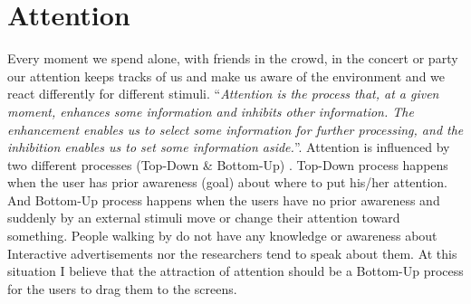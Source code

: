 \section{Attention}



Every moment we spend alone, with friends in the crowd, in the concert or party our attention keeps tracks of us and make us aware of the environment and we react differently for different stimuli. ``\emph{Attention is the process that, at a given moment, enhances some information and inhibits other information. The enhancement enables us to select some information for further processing, and the inhibition enables us to set some information aside.}''\cite{Attention}. Attention is influenced by two different processes (Top-Down \& Bottom-Up) \cite{attention1,Attention}. Top-Down process happens when the user has prior awareness (goal) about where to put his/her attention. And Bottom-Up process happens when the users have no prior awareness and suddenly by an external stimuli move or change their attention toward something. People walking by do not have any knowledge or awareness about Interactive advertisements nor the researchers tend to speak about them. At this situation I believe that the attraction of attention should be a Bottom-Up process for the users to drag them to the screens.

